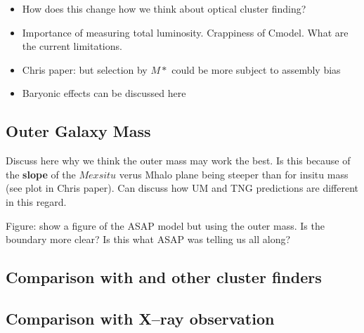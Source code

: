 \documentclass[a4paper,fleqn,usenatbib]{mnras}
\begin{document}
\begin{itemize}
    \item How does this change how we think about optical cluster finding?
    \item Importance of measuring total luminosity. Crappiness of Cmodel. What are the current limitations.
    \item Chris paper: but selection by $M*$ could be more subject to assembly bias
    \item Baryonic effects can be discussed here
\end{itemize}


\subsection{Outer Galaxy Mass}

Discuss here why we think the outer mass may work the best. Is this because of the \textbf{slope}
of the $Mexsitu$ verus Mhalo plane being steeper than for insitu mass (see plot in Chris paper).
Can discuss how UM and TNG predictions are different in this regard.

Figure: show a figure of the ASAP model but using the outer mass. Is the boundary more clear? Is
this what ASAP was telling us all along?

\subsection{Comparison with \redm{} and other cluster finders}
    \label{sec:richness}

    
\subsection{Comparison with X--ray observation}
    \label{sec:xray}
\end{document}
